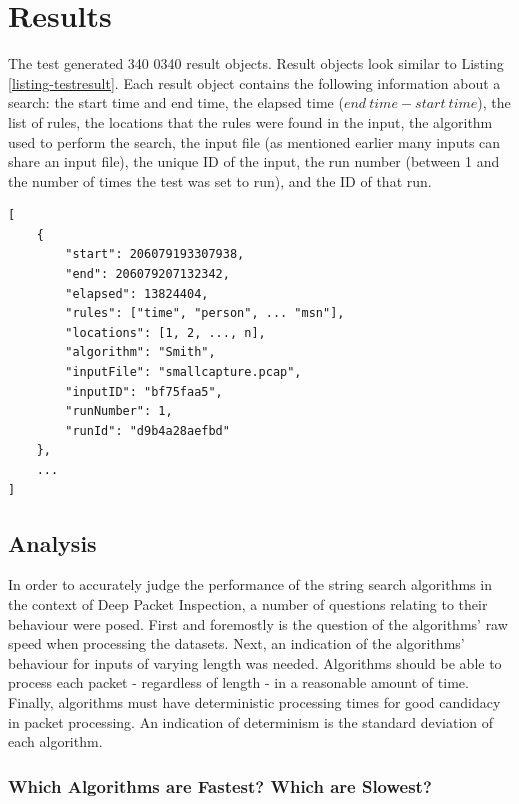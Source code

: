 \documentclass[9pt, conference]{IEEEtran}
\begin{document}
\section{Results}

The test generated 340 0340 result objects. Result objects look similar to Listing \ref{listing-testresult}. Each result object contains the following information about a search: the start time and end time, the elapsed time ($ end\ time - start\ time $), the list of rules, the locations that the rules were found in the input, the algorithm used to perform the search, the input file (as mentioned earlier many inputs can share an input file), the unique ID of the input, the run number (between 1 and the number of times the test was set to run), and the ID of that run.

\begin{lstlisting}[caption=Example result, label=listing-testresult, linewidth=\columnwidth, xleftmargin=5.0ex, float, floatplacement=H]
[
    {
        "start": 206079193307938,
        "end": 206079207132342,
        "elapsed": 13824404,
        "rules": ["time", "person", ... "msn"],
        "locations": [1, 2, ..., n],
        "algorithm": "Smith",
        "inputFile": "smallcapture.pcap",
        "inputID": "bf75faa5",
        "runNumber": 1,
        "runId": "d9b4a28aefbd"
    },
    ...
]
\end{lstlisting}

\subsection{Analysis}

In order to accurately judge the performance of the string search algorithms in the context of Deep Packet Inspection, a number of questions relating to their behaviour were posed. First and foremostly is the question of the algorithms' raw speed when processing the datasets. Next, an indication of the algorithms' behaviour for inputs of varying length was needed. Algorithms should be able to process each packet - regardless of length - in a reasonable amount of time. Finally, algorithms must have deterministic processing times for good candidacy in packet processing. An indication of determinism is the standard deviation of each algorithm. 

\subsubsection{Which Algorithms are Fastest? Which are Slowest?}
\end{document}
